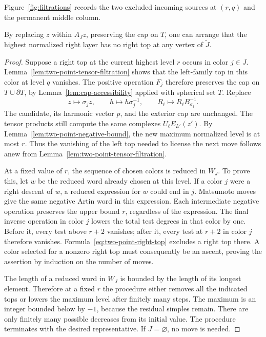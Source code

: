Figure~\ref{fig:filtrations} records the two excluded incoming sources at
\((r,q)\) and the permanent middle column.



\begin{lemma}
\label{lem:two-point-remove-tops}
By replacing \(z\) within \(A_Jz\), preserving the cap on \(T\), one
can arrange that the highest normalized right layer has no right
top at any vertex of \(\widetilde J\).
\end{lemma}

\begin{proof}
Suppose a right top at the current highest level \(r\) occurs in
color \(j\in J\).  Lemma~\ref{lem:two-point-tensor-filtration} shows
that the left-family top in this color at level \(q\) vanishes.
The positive operation \(F_j\) therefore preserves the cap on
\(T\cup\partial T\), by Lemma~\ref{lem:cap-accessibility} applied
with spherical set \(T\).  Replace
\[
 z\longmapsto\sigma_jz,
 \qquad h\longmapsto h\sigma_j^{-1},
 \qquad R_\ell\longmapsto R_\ell B_{\sigma_j}^{-1}.
\]
The candidate, its harmonic vector \(p\), and the exterior cap are
unchanged.  The tensor products still compute the same complexes
\(U_\ell E_{L'}(z')\).  By
Lemma~\ref{lem:two-point-negative-bound}, the new maximum normalized
level is at most \(r\).  Thus the vanishing of the left top needed
to license the next move follows anew from
Lemma~\ref{lem:two-point-tensor-filtration}.

At a fixed value of \(r\), the sequence of chosen colors is reduced
in \(W_J\).  To prove this, let \(w\) be the reduced word already
chosen at this level.  If a color \(j\) were a right descent of
\(w\), a reduced expression for \(w\) could end in \(j\).
Matsumoto moves give the same negative Artin word in this
expression.  Each intermediate negative operation preserves the
upper bound \(r\), regardless of the expression.  The final inverse
operation in color \(j\) lowers the total test degrees in that
color by one.  Before it, every test above \(r+2\) vanishes; after
it, every test at \(r+2\) in color \(j\) therefore vanishes.
Formula~\eqref{eq:two-point-right-top} excludes a right top there.
A color selected for a nonzero right top must consequently be an
ascent, proving the assertion by induction on the number of moves.

The length of a reduced word in \(W_J\) is bounded by the length of
its longest element.  Therefore at a fixed \(r\) the procedure
either removes all the indicated tops or lowers the maximum level
after finitely many steps.  The maximum is an integer bounded below
by \(-1\), because the residual simples remain.  There are only
finitely many possible decreases from its initial value.  The
procedure terminates with the desired representative.  If
\(J=\varnothing\), no move is needed.
\end{proof}

